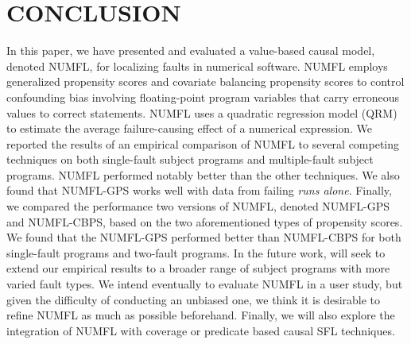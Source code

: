 \documentclass[times]{stvrauth}
\begin{document}
\section{CONCLUSION}\label{conclusion}
In this paper, we have presented and evaluated a value-based causal model, denoted NUMFL, for localizing faults in numerical software. NUMFL employs generalized propensity scores and covariate balancing propensity scores to control confounding bias involving floating-point program variables that carry erroneous values to correct statements.  NUMFL uses a quadratic regression model (QRM) to estimate the average failure-causing effect of a numerical expression.  We reported the results of an empirical comparison of NUMFL to several competing techniques on both single-fault subject programs and multiple-fault subject programs.  NUMFL performed notably better than the other techniques. We also found that NUMFL-GPS works well with data from failing {\it runs alone}.  Finally, we compared the performance two versions of NUMFL, denoted NUMFL-GPS and NUMFL-CBPS, based on the two aforementioned types of propensity scores. We found that the NUMFL-GPS performed better than NUMFL-CBPS for both single-fault programs and two-fault programs.   In the future work, will seek to extend our empirical results to a broader range of subject programs with more varied fault types.  We intend eventually to evaluate NUMFL in a user study, but given the difficulty of conducting an unbiased one, we think it is desirable to refine NUMFL as much as possible beforehand.  Finally, we will also explore the integration of NUMFL with coverage or predicate based causal SFL techniques.

%
%
%
\end{document}
